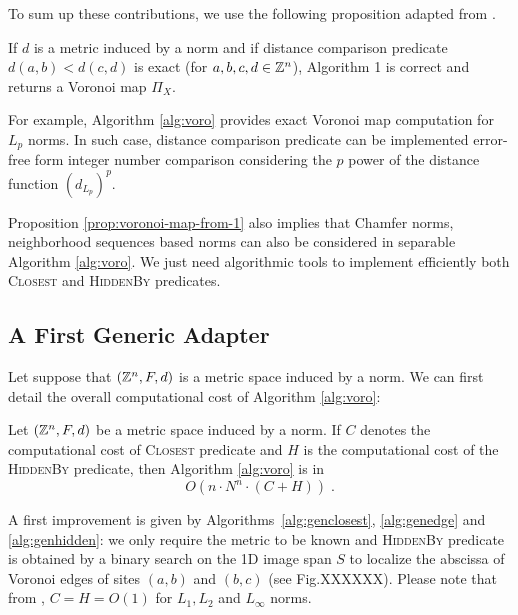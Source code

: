 \documentclass{llncs}
\begin{document}
To sum up these contributions, we use the following proposition
adapted from \cite{Hirata1996}.
\begin{proposition}
\label{prop:voronoi-map-from-1}
  If $d$ is a metric induced by a norm and if distance comparison
  predicate $d(a,b)<d(c,d)$ is exact (for $a,b,c,d\in{\mathbb{Z}}^n$), Algorithm
  1 is correct and returns a Voronoi map $\Pi_X$.
\end{proposition}

For example, Algorithm \ref{alg:voro} provides exact Voronoi map
computation for $L_p$ norms. In such case, distance comparison
predicate can be implemented error-free form integer number comparison
considering the $p$ power of the distance function $\left
(d_{L_p}\right)^p$.

Proposition \ref{prop:voronoi-map-from-1} also implies that Chamfer
norms, neighborhood sequences based norms can also be considered in
separable Algorithm \ref{alg:voro}. We just need algorithmic tools to
implement efficiently both \textsc{Closest} and \textsc{HiddenBy}
predicates.

\subsection{A First Generic Adapter}
\label{sec:first-gener-adapt}

Let suppose that $({\mathbb{Z}}^n,F,d)$ is a metric space induced by a norm. We
can first detail the overall computational cost of Algorithm
\ref{alg:voro}:

\begin{lemma}
\label{lem:generic}
   Let $({\mathbb{Z}}^n, F, d)$ be a metric space induced by a norm. If $C$
  denotes the computational cost of \textsc{Closest} predicate and $H$
  is the computational cost of the \textsc{HiddenBy} predicate, then
  Algorithm \ref{alg:voro} is in
  \begin{equation}
    O(n\cdot N^n\cdot (C+H))\;.
  \end{equation}
\end{lemma}


A first improvement is given by Algorithms~\ref{alg:genclosest},
\ref{alg:genedge} and \ref{alg:genhidden}: we only require the metric
to be known and \textsc{HiddenBy} predicate is obtained by a binary
search on the 1D image span $S$ to localize the abscissa of Voronoi
edges of sites $(a,b)$ and $(b,c)$ (see Fig.XXXXXX). Please note that
from \cite{Breu1995,roerdnik}, $C=H=O(1)$ for $L_1,L_2$ and $L_\infty$
norms.
\end{document}
